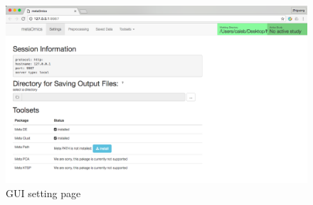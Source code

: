 \documentclass{article}
\begin{document}
\begin{figure}[H]
\begin{center}
\includegraphics[scale=0.35]{./figure/GUIsetting}
\caption{GUI setting page}
\label{fig:GUIsetting}
\end{center}
\end{figure}
\end{document}
